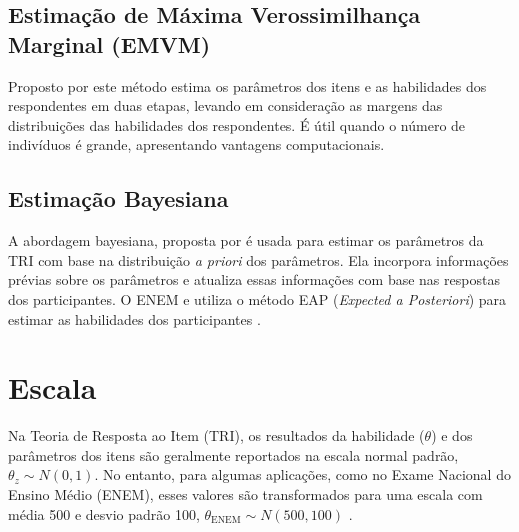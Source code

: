 \begin{comment}
Além do método de Estimação de Máxima Verossimilhança (EMV), existem outros métodos de estimação dos parâmetros, que são frequentemente utilizados em contextos de avaliação educacional, estes incluem:
\end{comment}

\subsection{Estimação de Máxima Verossimilhança Marginal (EMVM)}

 Proposto por  este método estima os parâmetros dos itens e as habilidades dos respondentes em duas etapas, levando em consideração as margens das distribuições das habilidades dos respondentes. É útil quando o número de indivíduos é grande, apresentando vantagens computacionais.
 
\subsection{Estimação Bayesiana}


A abordagem bayesiana, proposta por  é usada para estimar os parâmetros da TRI com base na distribuição \textit{a priori} dos parâmetros. Ela incorpora informações prévias sobre os parâmetros e atualiza essas informações com base nas respostas dos participantes. O ENEM e utiliza o método EAP (\textit{Expected a Posteriori}) para estimar as habilidades dos participantes \cite{inep2021}.

\section{Escala}


Na Teoria de Resposta ao Item (TRI), os resultados da habilidade ($\theta$) e dos parâmetros dos itens são geralmente reportados na escala normal padrão, $\theta_z \sim N(0, 1)$. No entanto, para algumas aplicações, como no Exame Nacional do Ensino Médio (ENEM), esses valores são transformados para uma escala com média 500 e desvio padrão 100, $\theta_{\text{ENEM}} \sim N(500, 100)$ \cite{inep2021procedimento}.

